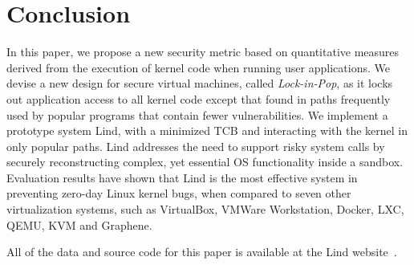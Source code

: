 \section{Conclusion}
\label{sec.conclusion}

In this paper, we propose a new security metric based on quantitative measures derived from
the execution of kernel code when running user applications.
We devise a new design for secure virtual machines, called \emph{Lock-in-Pop}, 
as it locks out application access to all kernel code except that found in paths frequently used by 
popular programs that contain fewer vulnerabilities. 
We implement a prototype system Lind, with a minimized TCB and interacting with the kernel in only popular paths. 
Lind addresses the need to support risky system calls by securely reconstructing complex, yet essential OS functionality 
inside a sandbox. 
Evaluation results have shown that Lind is the most effective system in preventing zero-day Linux kernel bugs, 
when compared to seven other virtualization systems, such as VirtualBox, VMWare Workstation, Docker, LXC, 
QEMU, KVM and Graphene.

All of the data and source code for this paper is available at the Lind website~\cite{Lind}. 